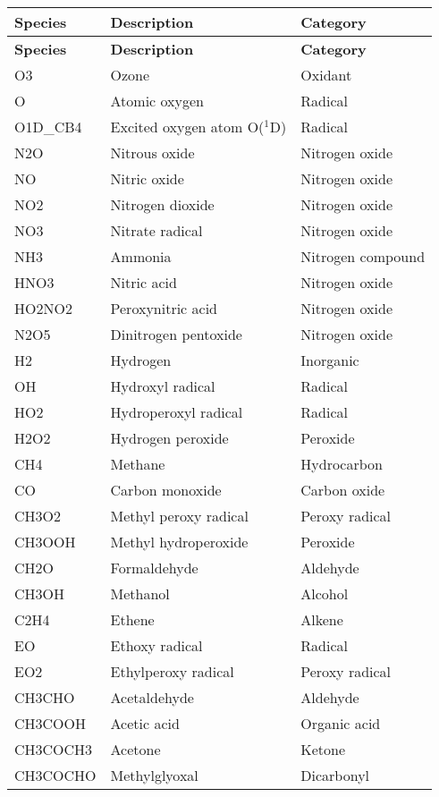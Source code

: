 \documentclass[12pt,a4paper]{article}
\begin{document}
\begin{longtable}{|p{3cm}|p{8cm}|p{3cm}|}
\hline
\textbf{Species} & \textbf{Description} & \textbf{Category} \\
\hline
\endfirsthead

\hline
\textbf{Species} & \textbf{Description} & \textbf{Category} \\
\hline
\endhead

O3 & Ozone & Oxidant \\
O & Atomic oxygen & Radical \\
O1D\_CB4 & Excited oxygen atom O($^1$D) & Radical \\
N2O & Nitrous oxide & Nitrogen oxide \\
NO & Nitric oxide & Nitrogen oxide \\
NO2 & Nitrogen dioxide & Nitrogen oxide \\
NO3 & Nitrate radical & Nitrogen oxide \\
NH3 & Ammonia & Nitrogen compound \\
HNO3 & Nitric acid & Nitrogen oxide \\
HO2NO2 & Peroxynitric acid & Nitrogen oxide \\
N2O5 & Dinitrogen pentoxide & Nitrogen oxide \\
H2 & Hydrogen & Inorganic \\
OH & Hydroxyl radical & Radical \\
HO2 & Hydroperoxyl radical & Radical \\
H2O2 & Hydrogen peroxide & Peroxide \\
CH4 & Methane & Hydrocarbon \\
CO & Carbon monoxide & Carbon oxide \\
CH3O2 & Methyl peroxy radical & Peroxy radical \\
CH3OOH & Methyl hydroperoxide & Peroxide \\
CH2O & Formaldehyde & Aldehyde \\
CH3OH & Methanol & Alcohol \\
C2H4 & Ethene & Alkene \\
EO & Ethoxy radical & Radical \\
EO2 & Ethylperoxy radical & Peroxy radical \\
CH3CHO & Acetaldehyde & Aldehyde \\
CH3COOH & Acetic acid & Organic acid \\
CH3COCH3 & Acetone & Ketone \\
CH3COCHO & Methylglyoxal & Dicarbonyl \\

\end{longtable}
\end{document}
